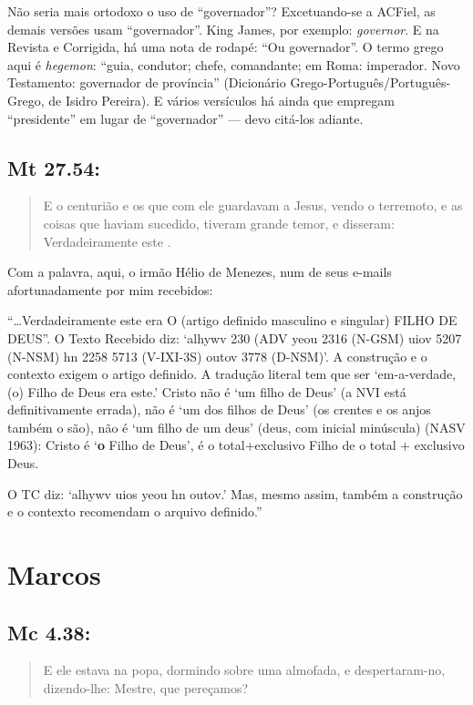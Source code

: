 Não seria mais ortodoxo o uso de ``governador''? Excetuando-se a ACFiel, as demais versões usam ``governador''. King James, por exemplo: \emph{governor}. E na Revista e Corrigida, há uma nota de rodapé: ``Ou governador''. O termo grego aqui é \emph{hegemon}: ``guia, condutor; chefe, comandante; em Roma: imperador. Novo
Testamento: governador de província'' (Dicionário Grego-Português/Português-Grego, de Isidro Pereira). E vários versículos há ainda que empregam ``presidente'' em lugar de ``governador'' --- devo citá-los adiante.


\subsection{Mt 27.54:}
\begin{quote}
 \small
 E o centurião e os que com ele guardavam a Jesus, vendo o terremoto, e as coisas que haviam sucedido, tiveram grande temor, e disseram: Verdadeiramente este .
\end{quote}

Com a palavra, aqui, o irmão Hélio de Menezes, num de seus e-mails afortunadamente por mim recebidos:

``\ldots Verdadeiramente este era O (artigo definido masculino e singular)
FILHO DE DEUS''. O Texto Recebido diz: `alhywv 230 (ADV yeou 2316 (N-GSM)
uiov 5207 (N-NSM) hn 2258 5713 (V-IXI-3S) outov 3778 (D-NSM)'. A
construção e o contexto exigem o artigo definido. A tradução literal tem
que ser `em-a-verdade, (o) Filho de Deus era este.' Cristo não é `um
filho de Deus' (a NVI está definitivamente errada), não é `um dos filhos
de Deus' (os crentes e os anjos também o são), não é `um filho de um
deus' (deus, com inicial minúscula) (NASV 1963): Cristo é `\textbf{o}
Filho de Deus', é o total+exclusivo Filho de o total $+$ exclusivo Deus.

O TC diz: `alhywv uios yeou hn outov.' Mas, mesmo assim, também a
construção e o contexto recomendam o arquivo definido.''

\section{Marcos}\label{seteda}
\subsection{Mc 4.38:}
\begin{quote}
 \small
E ele estava na popa, dormindo sobre uma almofada, e despertaram-no, dizendo-lhe: Mestre,  que pereçamos?
\end{quote}

